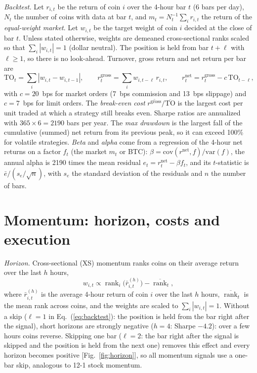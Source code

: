 \documentclass[aps,prl,onecolumn,superscriptaddress,nofootinbib]{revtex4-2}
\begin{document}
	\textit{Backtest.} Let $r_{i,t}$ be the return of coin $i$ over the 4-hour bar $t$ (6 bars per day), $N_t$ the number of coins with data at bar $t$, and $m_t = N_t^{-1} \sum_i r_{i,t}$ the return of the \emph{equal-weight market}. Let $w_{i,t}$ be the target weight of coin $i$ decided at the close of bar $t$. Unless stated otherwise, weights are demeaned cross-sectional ranks scaled so that $\sum_i |w_{i,t}| = 1$ (dollar neutral). The position is held from bar $t+\ell$ with $\ell \ge 1$, so there is no look-ahead. Turnover, gross return and net return per bar are
	\begin{equation}
		\mathrm{TO}_t = \sum_i \left| w_{i,t} - w_{i,t-1} \right|, \qquad
		r^{\mathrm{gross}}_t = \sum_i w_{i,t-\ell}\, r_{i,t}, \qquad
		r^{\mathrm{net}}_t = r^{\mathrm{gross}}_t - c\, \mathrm{TO}_{t-\ell} ,
		\label{eq:backtest}
	\end{equation}
	with $c = 20$~bps for market orders (7~bps commission and 13~bps slippage) and $c = 7$~bps for limit orders. The \emph{break-even cost} $\overline{r^{\mathrm{gross}}} / \overline{\mathrm{TO}}$ is the largest cost per unit traded at which a strategy still breaks even. Sharpe ratios are annualized with $365 \times 6 = 2190$ bars per year. The \emph{max drawdown} is the largest fall of the cumulative (summed) net return from its previous peak, so it can exceed 100\% for volatile strategies. \emph{Beta} and \emph{alpha} come from a regression of the 4-hour net returns on a factor $f_t$ (the market $m_t$ or BTC): $\beta = \mathrm{cov}(r^{\mathrm{net}}, f)/\mathrm{var}(f)$, the annual alpha is 2190 times the mean residual $e_t = r^{\mathrm{net}}_t - \beta f_t$, and its $t$-statistic is $\bar e / (s_e/\sqrt{n})$, with $s_e$ the standard deviation of the residuals and $n$ the number of bars.
	
	\section{Momentum: horizon, costs and execution}
	\label{app:momentum}
	
	\textit{Horizon.} Cross-sectional (XS) momentum ranks coins on their average return over the last $h$ hours,
	\begin{equation}
		w_{i,t} \propto \operatorname{rank}_i\big(\bar r^{(h)}_{i,t}\big) - \overline{\operatorname{rank}}_t,
		\label{eq:xs}
	\end{equation}
	where $\bar r^{(h)}_{i,t}$ is the average 4-hour return of coin $i$ over the last $h$ hours, $\overline{\operatorname{rank}}_t$ is the mean rank across coins, and the weights are scaled to $\sum_i |w_{i,t}| = 1$. Without a skip ($\ell = 1$ in Eq.~(\ref{eq:backtest}): the position is held from the bar right after the signal), short horizons are strongly negative ($h = 4$: Sharpe $-4.2$): over a few hours coins reverse. Skipping one bar ($\ell = 2$: the bar right after the signal is skipped and the position is held from the next one) removes this effect and every horizon becomes positive [Fig.~\ref{fig:horizon}], so all momentum signals use a one-bar skip, analogous to 12-1 stock momentum.
	
\end{document}
